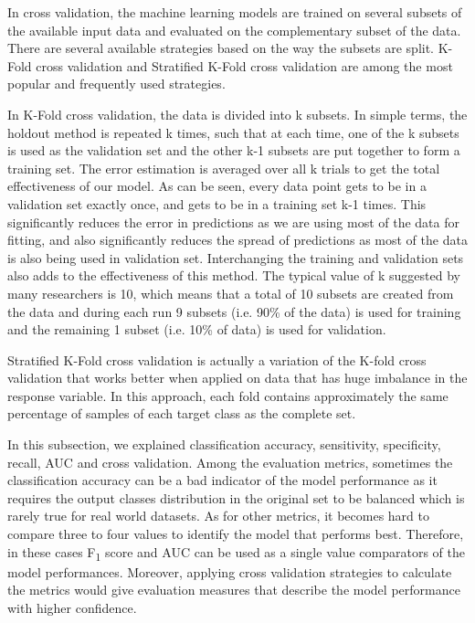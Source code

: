 \documentclass[11pt,openright]{report}
\begin{document}
In cross validation, the machine learning models are trained on several subsets of the available input data and evaluated on the complementary subset of the data. There are several available strategies based on the way the subsets are split. K-Fold cross validation and Stratified K-Fold cross validation are among the most popular and frequently used strategies.

In K-Fold cross validation, the data is divided into k subsets. In simple terms, the holdout method is repeated k times, such that at each time, one of the k subsets is used as the validation set and the other k-1 subsets are put together to form a training set. The error estimation is averaged over all k trials to get the total effectiveness of our model. As can be seen, every data point gets to be in a validation set exactly once, and gets to be in a training set k-1 times. This significantly reduces the error in predictions as we are using most of the data for fitting, and also significantly reduces the spread of predictions as most of the data is also being used in validation set. Interchanging the training and validation sets also adds to the effectiveness of this method. The typical value of k suggested by many researchers is 10, which means that a total of 10 subsets are created from the data and during each run 9 subsets (i.e. 90\% of the data) is used for training and the remaining 1 subset (i.e. 10\% of data) is used for validation. 

Stratified K-Fold cross validation is actually a variation of the K-fold cross validation that works better when applied on data that has huge imbalance in the response variable. In this approach, each fold contains approximately the same percentage of samples of each target class as the complete set.\newline

\noindent In this subsection, we explained classification accuracy, sensitivity, specificity, recall, AUC and cross validation. Among the evaluation metrics, sometimes the classification accuracy can be a bad indicator of the model performance as it requires the output classes distribution in the original set to be balanced which is rarely true for real world datasets. As for other metrics, it becomes hard to compare three to four values to identify the model that performs best. Therefore, in these cases F\textsubscript1 score and AUC can be used as a single value comparators of the model performances. Moreover, applying cross validation strategies to calculate the metrics would give evaluation measures that describe the model performance with higher confidence.
\end{document}
